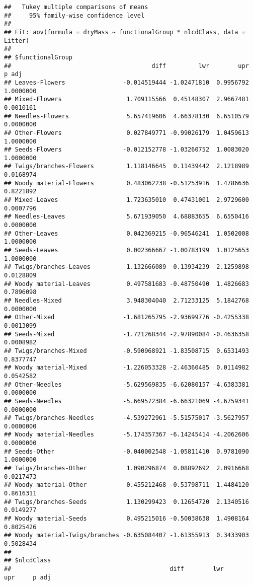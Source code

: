 \documentclass[
]{article}
\begin{document}
\begin{verbatim}
##   Tukey multiple comparisons of means
##     95% family-wise confidence level
## 
## Fit: aov(formula = dryMass ~ functionalGroup * nlcdClass, data = Litter)
## 
## $functionalGroup
##                                       diff         lwr        upr     p adj
## Leaves-Flowers                -0.014519444 -1.02471810  0.9956792 1.0000000
## Mixed-Flowers                  1.709115566  0.45148307  2.9667481 0.0010161
## Needles-Flowers                5.657419606  4.66378130  6.6510579 0.0000000
## Other-Flowers                  0.027849771 -0.99026179  1.0459613 1.0000000
## Seeds-Flowers                 -0.012152778 -1.03260752  1.0083020 1.0000000
## Twigs/branches-Flowers         1.118146645  0.11439442  2.1218989 0.0168974
## Woody material-Flowers         0.483062238 -0.51253916  1.4786636 0.8221892
## Mixed-Leaves                   1.723635010  0.47431001  2.9729600 0.0007796
## Needles-Leaves                 5.671939050  4.68883655  6.6550416 0.0000000
## Other-Leaves                   0.042369215 -0.96546241  1.0502008 1.0000000
## Seeds-Leaves                   0.002366667 -1.00783199  1.0125653 1.0000000
## Twigs/branches-Leaves          1.132666089  0.13934239  2.1259898 0.0128809
## Woody material-Leaves          0.497581683 -0.48750490  1.4826683 0.7896098
## Needles-Mixed                  3.948304040  2.71233125  5.1842768 0.0000000
## Other-Mixed                   -1.681265795 -2.93699776 -0.4255338 0.0013099
## Seeds-Mixed                   -1.721268344 -2.97890084 -0.4636358 0.0008982
## Twigs/branches-Mixed          -0.590968921 -1.83508715  0.6531493 0.8377747
## Woody material-Mixed          -1.226053328 -2.46360485  0.0114982 0.0542582
## Other-Needles                 -5.629569835 -6.62080157 -4.6383381 0.0000000
## Seeds-Needles                 -5.669572384 -6.66321069 -4.6759341 0.0000000
## Twigs/branches-Needles        -4.539272961 -5.51575017 -3.5627957 0.0000000
## Woody material-Needles        -5.174357367 -6.14245414 -4.2062606 0.0000000
## Seeds-Other                   -0.040002548 -1.05811410  0.9781090 1.0000000
## Twigs/branches-Other           1.090296874  0.08892692  2.0916668 0.0217473
## Woody material-Other           0.455212468 -0.53798711  1.4484120 0.8616311
## Twigs/branches-Seeds           1.130299423  0.12654720  2.1340516 0.0149277
## Woody material-Seeds           0.495215016 -0.50038638  1.4908164 0.8025426
## Woody material-Twigs/branches -0.635084407 -1.61355913  0.3433903 0.5028434
## 
## $nlcdClass
##                                            diff        lwr        upr     p adj

\end{verbatim}
\end{document}

